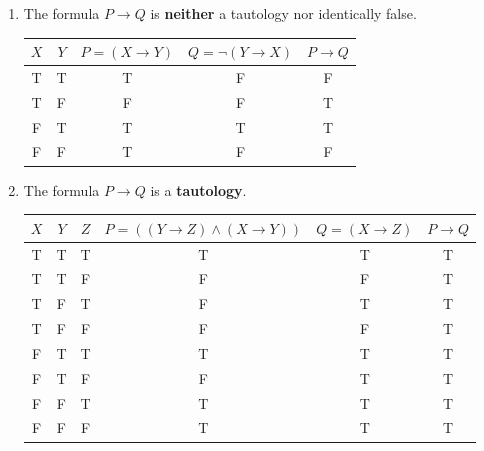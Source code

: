 \documentclass[12pt]{article}
\newcommand{\p}[1]{\item[\textnormal{(#1)}]}
\newenvironment{ps}
{\begin{enumerate}[leftmargin=0em, itemindent=1.5em]}
{\end{enumerate}}
\begin{document}
\begin{ps}
    \p{vii} The formula \(P \rightarrow Q\) is \textbf{neither} a tautology nor
    identically false.

        \begin{center}
        \begin{tabular}{|c|c|c|c|c|}
        \hline
        $X$ & $Y$ & $P = (X \rightarrow Y)$ & $Q = \neg (Y \rightarrow X)$ & $P \rightarrow Q$ \\
        \hline
        T & T & T & F & F \\
        T & F & F & F & T \\
        F & T & T & T & T \\
        F & F & T & F & F \\
        \hline
        \end{tabular}
        \end{center}

    \p{viii} The formula \(P \rightarrow Q\) is a \textbf{tautology}.

        \begin{center}
        \begin{tabular}{|c|c|c|c|c|c|}
        \hline
        $X$ & $Y$ & $Z$ & $P = ((Y \rightarrow Z) \wedge (X \rightarrow Y)) $ & $Q = (X \rightarrow
        Z)$ & $P \rightarrow Q$ \\
        \hline
        T & T & T & T & T & T \\
        T & T & F & F & F & T \\
        T & F & T & F & T & T \\
        T & F & F & F & F & T \\
        F & T & T & T & T & T \\
        F & T & F & F & T & T \\
        F & F & T & T & T & T \\
        F & F & F & T & T & T \\
        \hline
        \end{tabular}
        \end{center}

\end{ps}

\newpage
\end{document}
